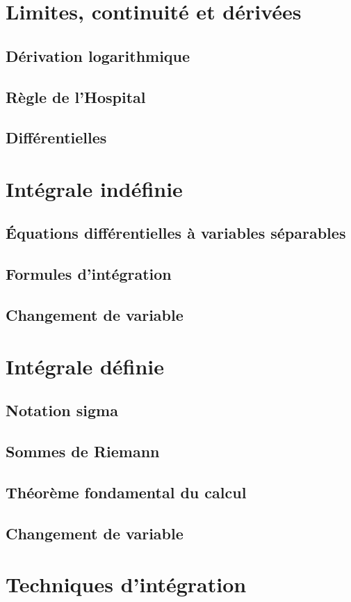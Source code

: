 \documentclass{article}
\begin{document}
\section{Limites, continuité et dérivées}
\subsection{Dérivation logarithmique}
\subsection{Règle de l’Hospital}
\subsection{Différentielles}
\section{Intégrale indéfinie}
\subsection{Équations différentielles à variables séparables}
\subsection{Formules d’intégration}
\subsection{Changement de variable}
\section{Intégrale définie}
\subsection{Notation sigma}
\subsection{Sommes de Riemann}
\subsection{Théorème fondamental du calcul}
\subsection{Changement de variable}
\section{Techniques d’intégration}
\end{document}
